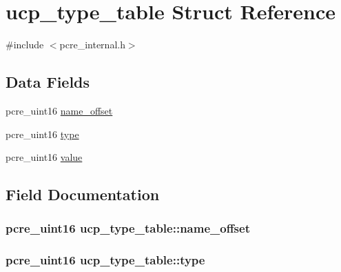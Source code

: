 \hypertarget{structucp__type__table}{}\section{ucp\+\_\+type\+\_\+table Struct Reference}
\label{structucp__type__table}


{\ttfamily \#include $<$pcre\+\_\+internal.\+h$>$}

\subsection*{Data Fields}
\begin{DoxyCompactItemize}
\item 
pcre\+\_\+uint16 \hyperlink{structucp__type__table_a46a79699715b8a1f5e040cf733b2f007}{name\+\_\+offset}
\item 
pcre\+\_\+uint16 \hyperlink{structucp__type__table_a50bf031a6568c12e69119f618918eb8f}{type}
\item 
pcre\+\_\+uint16 \hyperlink{structucp__type__table_a4adbaf2a4ff811876e537e596ec80dd1}{value}
\end{DoxyCompactItemize}


\subsection{Field Documentation}
\subsubsection[{\texorpdfstring{name\+\_\+offset}{name_offset}}]{\setlength{\rightskip}{0pt plus 5cm}pcre\+\_\+uint16 ucp\+\_\+type\+\_\+table\+::name\+\_\+offset}\hypertarget{structucp__type__table_a46a79699715b8a1f5e040cf733b2f007}{}\label{structucp__type__table_a46a79699715b8a1f5e040cf733b2f007}
\subsubsection[{\texorpdfstring{type}{type}}]{\setlength{\rightskip}{0pt plus 5cm}pcre\+\_\+uint16 ucp\+\_\+type\+\_\+table\+::type}\hypertarget{structucp__type__table_a50bf031a6568c12e69119f618918eb8f}{}\label{structucp__type__table_a50bf031a6568c12e69119f618918eb8f}
